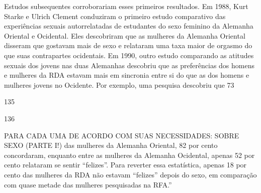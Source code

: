 Estudos subsequentes corroborariam esses primeiros resultados. Em 1988, Kurt Starke e Ulrich Clement conduziram o primeiro estudo comparativo das experiências sexuais autorrelatadas de estudantes do sexo feminino da Alemanha Oriental e Ocidental. Eles descobriram que as mulheres da Alemanha Oriental disseram que gostavam mais de sexo e relataram uma taxa maior de orgasmo do que suas contrapartes ocidentais. Em 1990, outro estudo comparando as atitudes sexuais dos jovens nas duas Alemanhas descobriu que as preferências dos homens e mulheres da RDA estavam mais em sincronia entre si do que as dos homens e mulheres jovens no Ocidente. Por exemplo, uma pesquisa descobriu que 73%
 \par 
135
 \par 
136
 \par 
PARA CADA UMA DE ACORDO COM SUAS NECESSIDADES: SOBRE SEXO (PARTE I!) das mulheres da Alemanha Oriental, {\color{blue}82} por cento concordaram, enquanto entre as mulheres da Alemanha Ocidental, apenas {\color{blue}52} por cento relataram se sentir “felizes”. Para reverter essa estatística, apenas {\color{blue}18} por cento das mulheres da RDA não estavam “felizes” depois do sexo, em comparação com quase metade das mulheres pesquisadas na RFA.”
 \par 
